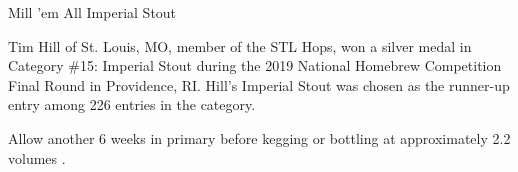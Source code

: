 \stylesection{\styleimperialstout}

\begin{recipie}{Mill 'em All Imperial Stout}

\begin{aboutblock}
Tim Hill of St. Louis, MO, member of the STL Hops, won a silver medal
in Category \#15: Imperial Stout during the 2019 National Homebrew Competition
Final Round in Providence, RI. Hill's Imperial Stout was chosen as the runner-up
entry among 226 entries in the category.
\end{aboutblock}


\begin{methodandtiming}
 
\begin{mashsteps}
\end{mashsteps}

\begin{fermentationsteps}
\end{fermentationsteps}

\begin{directions}
Allow another 6 weeks in primary before kegging or bottling at approximately
2.2 volumes .
\end{directions}

\end{methodandtiming}

\pagebreak

\begin{ingredientsblock}

\begin{malts}
\end{malts}

\begin{hops}
\end{hops}
\begin{yeasts}
\end{yeasts}

\end{ingredientsblock}

\end{recipie}
